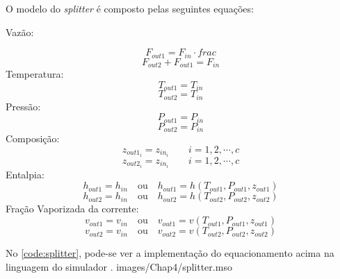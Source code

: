 O modelo do \textit{splitter} é composto pelas seguintes equações:

\begin{flushleft}
Vazão:
\end{flushleft}
\begin{equation}
F_{out1} = F_{in} \cdot frac
\end{equation}
\begin{equation}
F_{out2} + F_{out1} = F_{in}
\end{equation}
Temperatura:
\begin{equation}
T_{out1} = T_{in}
\end{equation}
\begin{equation}
T_{out2} = T_{in}
\end{equation}
Pressão:
\begin{equation}
P_{out1} = P_{in}
\end{equation}
\begin{equation}
P_{out2} = P_{in}
\end{equation}
Composição:
\begin{equation}
z_{out1_i} = z_{in_i} \qquad i=1,2,\cdots,c
\end{equation}
\begin{equation}
z_{out2_i} = z_{in_i} \qquad i=1,2,\cdots,c
\end{equation}
Entalpia:
\begin{equation}
h_{out1} = h_{in} \quad\textrm{ou}\quad h_{out1} = h(T_{out1}, P_{out1},
z_{out1})
\end{equation}
\begin{equation}
h_{out2} = h_{in} \quad\textrm{ou}\quad h_{out2} = h(T_{out2}, P_{out2},
z_{out2})
\end{equation}
Fração Vaporizada da corrente:
\begin{equation}
v_{out1} = v_{in} \quad\textrm{ou}\quad v_{out1} = v(T_{out1}, P_{out1},
z_{out1})
\end{equation}
\begin{equation}
v_{out2} = v_{in} \quad\textrm{ou}\quad v_{out2} = v(T_{out2}, P_{out2},
z_{out2})
\end{equation}

No \autoref{code:splitter}, pode-se ver a implementação do equacionamento acima
na linguagem do simulador \emso.
 {images/Chap4/splitter.mso}

